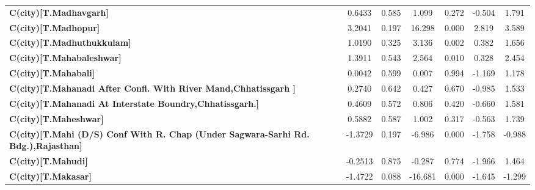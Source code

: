 \begin{center}
\begin{tabular}{lcccccc}
\textbf{C(city)[T.Madhavgarh]}                                                                      &       0.6433  &        0.585     &     1.099  &         0.272        &       -0.504    &        1.791     \\
\textbf{C(city)[T.Madhopur]}                                                                        &       3.2041  &        0.197     &    16.298  &         0.000        &        2.819    &        3.589     \\
\textbf{C(city)[T.Madhuthukkulam]}                                                                  &       1.0190  &        0.325     &     3.136  &         0.002        &        0.382    &        1.656     \\
\textbf{C(city)[T.Mahabaleshwar]}                                                                   &       1.3911  &        0.543     &     2.564  &         0.010        &        0.328    &        2.454     \\
\textbf{C(city)[T.Mahabali]}                                                                        &       0.0042  &        0.599     &     0.007  &         0.994        &       -1.169    &        1.178     \\
\textbf{C(city)[T.Mahanadi After Confl. With River Mand,Chhatissgarh ]}                             &       0.2740  &        0.642     &     0.427  &         0.670        &       -0.985    &        1.533     \\
\textbf{C(city)[T.Mahanadi At Interstate Boundry,Chhatissgarh.]}                                    &       0.4609  &        0.572     &     0.806  &         0.420        &       -0.660    &        1.581     \\
\textbf{C(city)[T.Maheshwar]}                                                                       &       0.5882  &        0.587     &     1.002  &         0.317        &       -0.563    &        1.739     \\
\textbf{C(city)[T.Mahi (D/S) Conf With R. Chap (Under Sagwara-Sarhi Rd. Bdg.),Rajasthan]}           &      -1.3729  &        0.197     &    -6.986  &         0.000        &       -1.758    &       -0.988     \\
\textbf{C(city)[T.Mahudi]}                                                                          &      -0.2513  &        0.875     &    -0.287  &         0.774        &       -1.966    &        1.464     \\
\textbf{C(city)[T.Makasar]}                                                                         &      -1.4722  &        0.088     &   -16.681  &         0.000        &       -1.645    &       -1.299     \\

\end{tabular}
\end{center}
